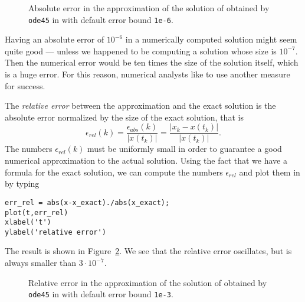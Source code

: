 \begin{figure}[htb]
   \centerline{%
   }
   \caption{Absolute error in the approximation of the solution of
   \protect{} obtained by {\tt ode45} in \protect\Matlab with 
	default error bound {\tt 1e-6}.}
   \label{fig:ode45err0}
\end{figure}

Having an absolute error of $10^{-6}$ in a numerically computed solution might
seem quite good --- unless we happened to be computing a solution whose size 
is $10^{-7}$.  Then the numerical error would be ten times the size of the 
solution itself, which is a huge error.  For this reason, numerical analysts
like to use another measure for success.  

The {\em relative error\/} between 
the approximation and the exact solution is the absolute error normalized by 
the size of the exact solution, that is  
\[
\epsilon_{rel}(k) = \frac{\epsilon_{abs}(k)}{|x(t_k)|} 
= \frac{|x_k - x(t_k)|}{|x(t_k)|}.
\]
The numbers $\epsilon_{rel}(k)$ must be uniformly small in order to guarantee
a good numerical approximation to the actual solution.  Using the fact
that we have a formula for the exact solution, we can compute the numbers 
$\epsilon_{rel}$ and plot them in \Matlab by typing
\begin{verbatim}
err_rel = abs(x-x_exact)./abs(x_exact);
plot(t,err_rel)
xlabel('t')
ylabel('relative error')
\end{verbatim} 
The result is shown in Figure~\ref{fig:ode45err1}.  We see that the relative 
error oscillates, but is always smaller than $3\cdot 10^{-7}$.
\begin{figure}[htb]
   \centerline{%
   }
   \caption{Relative error in the approximation of the solution of
   \protect{} obtained by {\tt ode45} in \protect\Matlab with 
	default error bound {\tt 1e-3}.}
   \label{fig:ode45err1}
\end{figure}

